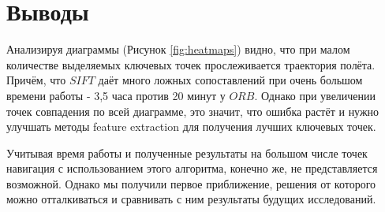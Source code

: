 \section{Выводы}

Анализируя диаграммы (Рисунок \ref{fig:heatmaps}) видно, что при малом количестве выделяемых ключевых точек прослеживается траектория полёта. Причём, что $SIFT$ даёт много ложных сопоставлений при очень большом времени работы - 3,5 часа против 20 минут у $ORB$. Однако при увеличении точек совпадения  по всей диаграмме, это значит, что ошибка растёт и нужно улучшать методы feature extraction для получения лучших ключевых точек.

Учитывая время работы и полученные результаты на большом числе точек навигация с использованием этого алгоритма, конечно же, не представляется возможной. Однако мы получили первое приближение, решения  от которого можно отталкиваться и сравнивать с ним результаты будущих исследований.

\newpage